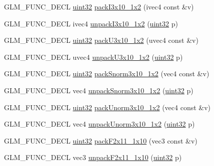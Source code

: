 \begin{DoxyCompactItemize}
\item 
G\+L\+M\+\_\+\+F\+U\+N\+C\+\_\+\+D\+E\+C\+L \hyperlink{group__gtc__type__precision_ga202b6a53c105fcb7e531f9b443518451}{uint32} \hyperlink{group__gtc__packing_ga032e18fa5bc5b8f3897104aeb2f1e195}{pack\+I3x10\+\_\+1x2} (ivec4 const \&v)
\item 
G\+L\+M\+\_\+\+F\+U\+N\+C\+\_\+\+D\+E\+C\+L ivec4 \hyperlink{group__gtc__packing_ga08bcd34cf9c34701d658dd861ee6e300}{unpack\+I3x10\+\_\+1x2} (\hyperlink{group__gtc__type__precision_ga202b6a53c105fcb7e531f9b443518451}{uint32} p)
\item 
G\+L\+M\+\_\+\+F\+U\+N\+C\+\_\+\+D\+E\+C\+L \hyperlink{group__gtc__type__precision_ga202b6a53c105fcb7e531f9b443518451}{uint32} \hyperlink{group__gtc__packing_gaf656d8862628f96b20de7a36eaa1fe56}{pack\+U3x10\+\_\+1x2} (uvec4 const \&v)
\item 
G\+L\+M\+\_\+\+F\+U\+N\+C\+\_\+\+D\+E\+C\+L uvec4 \hyperlink{group__gtc__packing_ga119aa2d7d55952f9dc4214390a6ffefc}{unpack\+U3x10\+\_\+1x2} (\hyperlink{group__gtc__type__precision_ga202b6a53c105fcb7e531f9b443518451}{uint32} p)
\item 
G\+L\+M\+\_\+\+F\+U\+N\+C\+\_\+\+D\+E\+C\+L \hyperlink{group__gtc__type__precision_ga202b6a53c105fcb7e531f9b443518451}{uint32} \hyperlink{group__gtc__packing_ga0d4157cec37c0312216a7be1cc92df54}{pack\+Snorm3x10\+\_\+1x2} (vec4 const \&v)
\item 
G\+L\+M\+\_\+\+F\+U\+N\+C\+\_\+\+D\+E\+C\+L vec4 \hyperlink{group__gtc__packing_ga8b8bb827a3743ca553d8702d3e337101}{unpack\+Snorm3x10\+\_\+1x2} (\hyperlink{group__gtc__type__precision_ga202b6a53c105fcb7e531f9b443518451}{uint32} p)
\item 
G\+L\+M\+\_\+\+F\+U\+N\+C\+\_\+\+D\+E\+C\+L \hyperlink{group__gtc__type__precision_ga202b6a53c105fcb7e531f9b443518451}{uint32} \hyperlink{group__gtc__packing_ga2cf2d11b40bd48639110456fd74c2e33}{pack\+Unorm3x10\+\_\+1x2} (vec4 const \&v)
\item 
G\+L\+M\+\_\+\+F\+U\+N\+C\+\_\+\+D\+E\+C\+L vec4 \hyperlink{group__gtc__packing_gaf69ace2b5e9234f8afb4e99c3df1193d}{unpack\+Unorm3x10\+\_\+1x2} (\hyperlink{group__gtc__type__precision_ga202b6a53c105fcb7e531f9b443518451}{uint32} p)
\item 
G\+L\+M\+\_\+\+F\+U\+N\+C\+\_\+\+D\+E\+C\+L \hyperlink{group__gtc__type__precision_ga202b6a53c105fcb7e531f9b443518451}{uint32} \hyperlink{group__gtc__packing_ga8c2a0eeee677ca4dafd9e093d9e81062}{pack\+F2x11\+\_\+1x10} (vec3 const \&v)
\item 
G\+L\+M\+\_\+\+F\+U\+N\+C\+\_\+\+D\+E\+C\+L vec3 \hyperlink{group__gtc__packing_ga8b9c7991eb021d95c778bf5c0b2f7824}{unpack\+F2x11\+\_\+1x10} (\hyperlink{group__gtc__type__precision_ga202b6a53c105fcb7e531f9b443518451}{uint32} p)

\end{DoxyCompactItemize}
